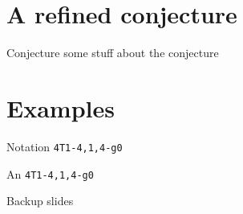 \documentclass[xcolor=dvipsnames]{beamer}
\theoremstyle{plain}
\begin{document}
  \section{A refined conjecture}{
    \begin{frame}{Conjecture}
      some stuff about the conjecture
    \end{frame}
  }
  \section{Examples}{
    \begin{frame}{Notation}
      \texttt{4T1-4,1,4-g0}
    \end{frame}
    \begin{frame}{An}
      \texttt{4T1-4,1,4-g0}
    \end{frame}
  }
  \appendix
  \begin{frame}{Backup slides}
  \end{frame}
\end{document}
